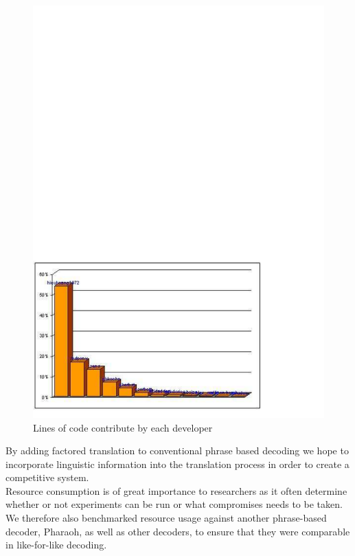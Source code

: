 \documentclass[11pt]{report}
\theoremstyle{plain}
\begin{document}
{\begin{center}
\begin{figure}[h]
\centering
\includegraphics[scale=0.8]{hieu-1}
\caption{Lines of code contribute by each developer}
\end{figure}
\end{center}

By adding factored translation to conventional phrase based decoding we hope to incorporate linguistic information into the translation process in order to create a competitive system.\\

Resource consumption is of great importance to researchers as it often determine whether or not experiments can be run or what compromises needs to be taken. We therefore also benchmarked resource usage against another phrase-based decoder, Pharaoh, as well as other decoders, to ensure that they were comparable in like-for-like decoding.\\

}
\end{document}
